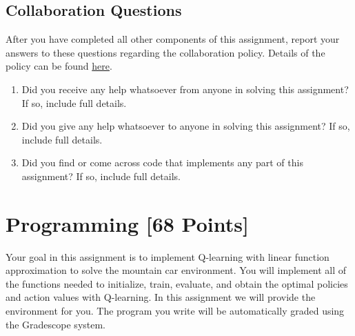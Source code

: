 \documentclass[11pt,addpoints,answers]{exam}
\begin{document}
\begin{questions}

    \clearpage    \newpage
\newpage
\section{Collaboration Questions}
After you have completed all other components of this assignment, report your answers to these questions regarding the collaboration policy. Details of the policy can be found \href{http://www.cs.cmu.edu/~mgormley/courses/10601/syllabus.html}{here}.
\begin{enumerate}
    \item Did you receive any help whatsoever from anyone in solving this assignment? If so, include full details.
    \item Did you give any help whatsoever to anyone in solving this assignment? If so, include full details.
    \item Did you find or come across code that implements any part of this assignment? If so, include full details.
\end{enumerate}

\begin{your_solution}[height=6cm]

\end{your_solution}
    \newpage
    \end{questions}
    
\section{Programming [68 Points]}
\label{sec:code}

Your goal in this assignment is to implement Q-learning with linear function approximation to solve the mountain car environment. You will implement all of the functions needed to initialize, train, evaluate, and obtain the optimal policies and action values with Q-learning. In this assignment we will provide the environment for you. The program you write will be automatically graded using the Gradescope system.
\end{document}
